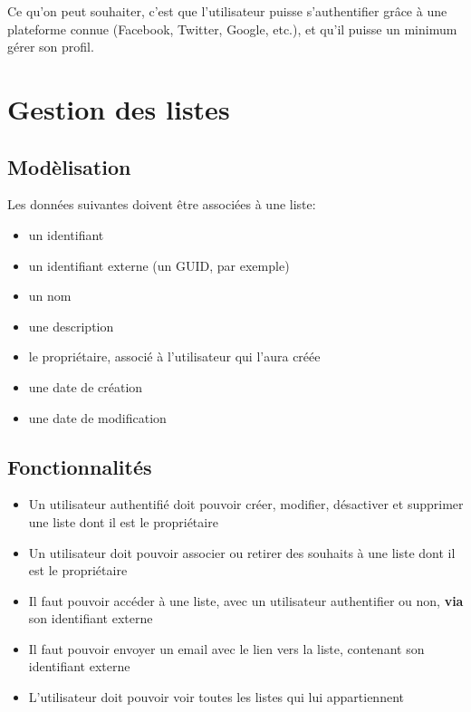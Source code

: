 \documentclass[11pt]{amsbook}
\begin{document}
Ce qu’on peut souhaiter, c’est que l’utilisateur puisse s’authentifier grâce à une plateforme connue (Facebook, Twitter, Google, etc.), et qu’il puisse un minimum gérer son profil.


\hypertarget{x-gestion-des-listes}{\section{Gestion des listes}}
\hypertarget{x-modèlisation}{\subsection{Modèlisation}}
Les données suivantes doivent être associées à une liste:


\begin{itemize}

\item un identifiant

\item un identifiant externe (un GUID, par exemple)

\item un nom

\item une description

\item le propriétaire, associé à l’utilisateur qui l’aura créée

\item une date de création

\item une date de modification

\end{itemize}


\hypertarget{x-fonctionnalités}{\subsection{Fonctionnalités}}
\begin{itemize}

\item Un utilisateur authentifié doit pouvoir créer, modifier, désactiver et supprimer une liste dont il est le propriétaire

\item Un utilisateur doit pouvoir associer ou retirer des souhaits à une liste dont il est le propriétaire

\item Il faut pouvoir accéder à une liste, avec un utilisateur authentifier ou non, \textbf{via} son identifiant externe

\item Il faut pouvoir envoyer un email avec le lien vers la liste, contenant son identifiant externe

\item L’utilisateur doit pouvoir voir toutes les listes qui lui appartiennent

\end{itemize}
\end{document}
